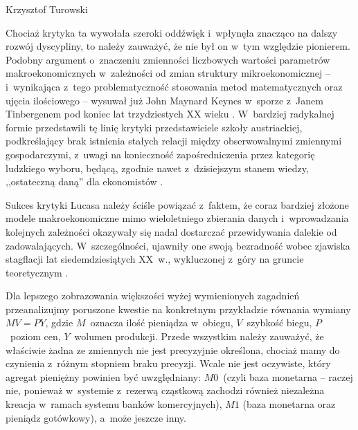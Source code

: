 \begin{artplenv}{Krzysztof Turowski}

Chociaż krytyka ta wywołała szeroki oddźwięk i~wpłynęła znacząco na dalszy rozwój dyscypliny, to należy zauważyć, że nie
był on w~tym względzie pionierem. Podobny argument o~znaczeniu zmienności liczbowych wartości parametrów
makroekonomicznych w~zależności od zmian struktury mikroekonomicznej  --  i~wynikająca z~tego problematyczność
stosowania metod matematycznych oraz ujęcia ilościowego  --  wysuwał już John Maynard Keynes w~sporze z~Janem
Tinbergenem pod koniec lat trzydziestych XX wieku
\parencite{keynes_professor_1939}.
W~bardziej radykalnej formie
przedstawili tę linię krytyki przedstawiciele szkoły austriackiej, podkreślający brak istnienia stałych relacji między
obserwowalnymi zmiennymi gospodarczymi, z~uwagi na konieczność zapośredniczenia przez kategorię ludzkiego wyboru,
będącą, zgodnie nawet z~dzisiejszym stanem wiedzy, ,,ostateczną daną'' dla ekonomistów
\parencite{mises_ludzkie_2007,rothbard_praxeology:_1976}.

Sukces krytyki Lucasa należy ściśle powiązać z~faktem, że coraz bardziej złożone modele makroekonomiczne mimo
wieloletniego zbierania danych i~wprowadzania kolejnych zależności okazywały się nadal dostarczać przewidywania dalekie
od zadowalających. W~szczególności, ujawniły one swoją bezradność wobec zjawiska stagflacji lat siedemdziesiątych
XX~w., wykluczonej z~góry na gruncie teoretycznym
\parencite{kydland_econometrics_1991}.

Dla lepszego zobrazowania większości wyżej wymienionych zagadnień przeanalizujmy poruszone kwestie na konkretnym
przykładzie równania wymiany $MV = PY$, gdzie $M$~oznacza ilość pieniądza w~obiegu, $V$~szybkość biegu, $P$~poziom cen,
$Y$~wolumen produkcji. Przede wszystkim należy zauważyć, że właściwie żadna ze zmiennych nie
jest precyzyjnie określona, chociaż mamy do czynienia z~różnym stopniem braku precyzji.
Wcale nie jest oczywiste, który agregat pieniężny powinien być
uwzględniany: $M0$~(czyli baza monetarna -- raczej nie, ponieważ w~systemie z~rezerwą cząstkową zachodzi
również niezależna kreacja w~ramach systemu banków komercyjnych), $M1$ (baza monetarna oraz pieniądz gotówkowy), a~może jeszcze
inny.


\end{artplenv}

